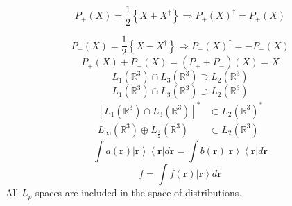 \documentclass[aps,preprint]{revtex4}%
\begin{document}
\[
P_{+}\left(  X\right)  =\frac{1}{2}\left\{  X+X^{\dagger}\right\}  \Rightarrow
P_{+}\left(  X\right)  ^{\dagger}=P_{+}\left(  X\right)
\]
%

\[
P_{-}\left(  X\right)  =\frac{1}{2}\left\{  X-X^{\dagger}\right\}  \Rightarrow
P_{-}\left(  X\right)  ^{\dagger}=-P_{-}\left(  X\right)
\]%
\[
P_{+}\left(  X\right)  +P_{-}\left(  X\right)  =\left(  P_{+}+P_{-}\right)
\left(  X\right)  =X
\]%
\[
L_{1}\left(  \mathbb{R}^{3}\right)  \cap L_{3}\left(  \mathbb{R}^{3}\right)
\supset L_{2}\left(  \mathbb{R}^{3}\right)
\]%
\[
L_{1}\left(  \mathbb{R}^{3}\right)  \cap L_{3}\left(  \mathbb{R}^{3}\right)
\supset L_{2}\left(  \mathbb{R}^{3}\right)
\]%
\begin{align*}
\left[  L_{1}\left(  \mathbb{R}^{3}\right)  \cap L_{3}\left(  \mathbb{R}%
^{3}\right)  \right]  ^{\ast}  & \subset L_{2}\left(  \mathbb{R}^{3}\right)
^{\ast}\\
L_{\infty}\left(  \mathbb{R}^{3}\right)  \oplus L_{\frac{3}{2}}\left(
\mathbb{R}^{3}\right)    & \subset L_{2}\left(  \mathbb{R}^{3}\right)
\end{align*}%
\[
\int a\left(  \boldsymbol{r}\right)  \left\vert \boldsymbol{r}\right\rangle
\left\langle \boldsymbol{r}\right\vert d\boldsymbol{r=}\int b\left(
\boldsymbol{r}\right)  \left\vert \boldsymbol{r}\right\rangle \left\langle
\boldsymbol{r}\right\vert d\boldsymbol{r}%
\]%
\[
f=\int f\left(  \boldsymbol{r}\right)  \left\vert \boldsymbol{r}\right\rangle
d\boldsymbol{r}%
\]
All $L_{p}$ spaces are included in the space of distributions.
\end{document}

